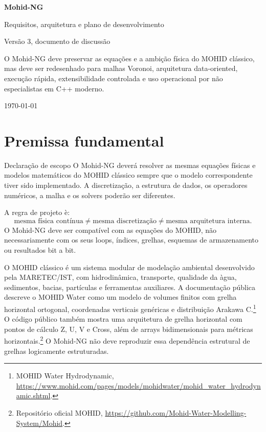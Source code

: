 \documentclass[11pt,a4paper]{article}
\begin{document}
\begin{titlepage}
\centering
\vspace*{14mm}
{\Huge\bfseries\color{MohidBlue} Mohid-NG\par}
\vspace{3mm}
{\Large\color{MohidInk} Requisitos, arquitetura e plano de desenvolvimento\par}
\vspace{5mm}
{\large\color{MohidGray} Vers\~ao 3, documento de discuss\~ao\par}
\vfill
\begin{tcolorbox}[colback=MohidBlue!5,width=0.86\textwidth]
\large
O Mohid-NG deve preservar as equa\c{c}\~oes e a ambi\c{c}\~ao f\'isica do MOHID cl\'assico, mas deve ser redesenhado para malhas Voronoi, arquitetura data-oriented, execu\c{c}\~ao r\'apida, extensibilidade controlada e uso operacional por n\~ao especialistas em C++ moderno.
\end{tcolorbox}
\vfill
{\color{MohidGray}\today\par}
\end{titlepage}

\tableofcontents
\newpage

\section{Premissa fundamental}

\begin{principlebox}{Declara\c{c}\~ao de escopo}
O Mohid-NG dever\'a resolver as mesmas equa\c{c}\~oes f\'isicas e modelos matem\'aticos do MOHID cl\'assico sempre que o modelo correspondente tiver sido implementado. A discretiza\c{c}\~ao, a estrutura de dados, os operadores num\'ericos, a malha e os solvers poder\~ao ser diferentes.
\end{principlebox}

A regra de projeto \`e:
\[
\text{mesma f\'isica cont\'inua}\neq\text{mesma discretiza\c{c}\~ao}\neq\text{mesma arquitetura interna}.
\]
O Mohid-NG deve ser compat\'ivel com as equa\c{c}\~oes do MOHID, n\~ao necessariamente com os seus loops, \'{i}ndices, grelhas, esquemas de armazenamento ou resultados bit a bit.

O MOHID cl\'assico \'e um sistema modular de modela\c{c}\~ao ambiental desenvolvido pela MARETEC/IST, com hidrodin\^amica, transporte, qualidade da \`agua, sedimentos, bacias, part\'iculas e ferramentas auxiliares. A documenta\c{c}\~ao p\'ublica descreve o MOHID Water como um modelo de volumes finitos com grelha horizontal ortogonal, coordenadas verticais gen\'ericas e distribui\c{c}\~ao Arakawa C.\footnote{MOHID Water Hydrodynamic, \url{https://www.mohid.com/pages/models/mohidwater/mohid_water_hydrodynamic.shtml}.} O c\'odigo p\'ublico tamb\'em mostra uma arquitetura de grelha horizontal com pontos de c\'alculo Z, U, V e Cross, al\'em de arrays bidimensionais para m\'etricas horizontais.\footnote{Reposit\'orio oficial MOHID, \url{https://github.com/Mohid-Water-Modelling-System/Mohid}.} O Mohid-NG n\~ao deve reproduzir essa depend\^encia estrutural de grelhas logicamente estruturadas.
\end{document}
